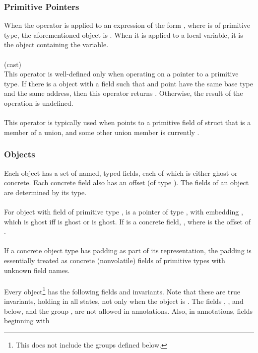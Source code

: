 \documentclass[preprint,nocopyrightspace]{sigplanconf}
\begin{document}
{{\subsubsection{Primitive Pointers}
When the \vcc{&} operator is applied to an expression of the
form , where  is of primitive type, the
aforementioned object is . When it is applied to a local
variable, it is the object containing the variable.
\\\\
 (cast)\\
This operator is well-defined only when operating on a pointer  to a
primitive type. If there is a \vcc{\valid} object  with a field 
such that  and  point have the same base type and
the same address, then this operator returns . Otherwise,
the result of the operation is undefined.
\\\\
This operator is typically used when  points to a primitive
field of struct that is a member of a union, and some other union
member is currently \vcc{\valid}.  

\subsubsection{Objects}

Each object has a set of named, typed fields, 
each of which is either ghost or concrete. Each
concrete field also has an offset (of type ). 
The fields of an object are determined by its type. 
\\\\
For object  with field  of primitive type , 
 is a pointer of type , with 
embedding , which is
ghost iff  is ghost or  is ghost. If  is a
concrete field, ,
where  is the offset of . 
\\\\
If a concrete object type has padding as part of its representation, the
padding is essentially treated as concrete (nonvolatile) fields of
primitive types with unknown field names.
\\\\
Every object\footnote{This does not include the  groups defined
below.} has the following fields and invariants. Note that these
are true invariants, holding in all states, not only when the object
is \vcc{\closed}. The fields \vcc{\version}, ,
and \vcc{\blobifiable} below, and the
group \vcc{\ownerOb}, are not allowed in annotations. Also, in
annotations, fields beginning with }}
\end{document}
